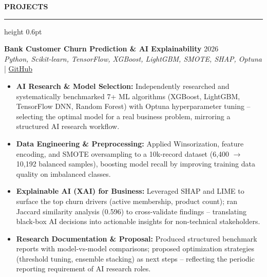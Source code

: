 ﻿\documentclass{resume}
\renewcommand{\sectionskip}{\vspace{5pt}}
\renewcommand{\sectionlineskip}{\vspace{3pt}}
\renewenvironment{rSection}[1]{
  \sectionskip
  {\color{headerblue}\textbf{\MakeUppercase{#1}}}
  \sectionlineskip
  {\color{rulegray}\hrule height 0.6pt}
  \vspace{0pt}
  \begin{list}{}{
    \setlength{\leftmargin}{0em}
    \setlength{\topsep}{0pt}
    \setlength{\partopsep}{0pt}
    \setlength{\parsep}{0pt}
    \setlength{\itemsep}{0pt}
  }
  \item[]
}{
  \end{list}
}
\begin{document}
\begin{rSection}{Projects}
    \item \textbf{Bank Customer Churn Prediction \& AI Explainability} \hfill 2026\\
    {\small \textit{Python, Scikit-learn, TensorFlow, XGBoost, LightGBM, SMOTE, SHAP, Optuna}} \hfill | \href{https://github.com/ThanhThang5722/Bank-Customer-Churn-Prediction}{GitHub}
    {\small
    \begin{itemize}[itemsep=4pt, parsep=0pt, leftmargin=1.2em]
        \item \textbf{AI Research \& Model Selection:} Independently researched and systematically benchmarked 7+ ML algorithms (XGBoost, LightGBM, TensorFlow DNN, Random Forest) with Optuna hyperparameter tuning -- selecting the optimal model for a real business problem, mirroring a structured AI research workflow.
        \item \textbf{Data Engineering \& Preprocessing:} Applied Winsorization, feature encoding, and SMOTE oversampling to a 10k-record dataset (6,400 $\rightarrow$ 10,192 balanced samples), boosting model recall by improving training data quality on imbalanced classes.
        \item \textbf{Explainable AI (XAI) for Business:} Leveraged SHAP and LIME to surface the top churn drivers (active membership, product count); ran Jaccard similarity analysis (0.596) to cross-validate findings -- translating black-box AI decisions into actionable insights for non-technical stakeholders.
        \item \textbf{Research Documentation \& Proposal:} Produced structured benchmark reports with model-vs-model comparisons; proposed optimization strategies (threshold tuning, ensemble stacking) as next steps -- reflecting the periodic reporting requirement of AI research roles.
    \end{itemize}
    }
    \vspace{15pt}


\end{rSection}
\end{document}
